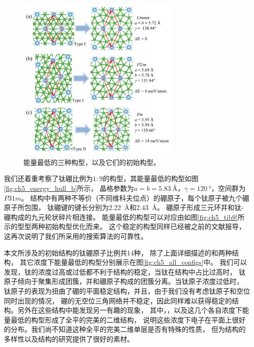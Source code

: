 \begin{figure}[htb]
  \includegraphics[width=0.72\textwidth]{figs/ch5_tib7_last3.png}
  \centering
  \caption{能量最低的三种构型，以及它们的初始构型。}
  \label{fig:ch5_tib7_last3}
\end{figure}


我们还着重考察了钛硼比例为$1:9$的构型，其能量最低的构型如图\ref{fig:ch5_energy_hull_b}所示，
晶格参数为$a=b=\SI{5.83}{\angstrom}$，$\gamma=\SI{120}{\degree}$，空间群为$P31m$。
结构中有两种不等价（不同维科夫位点）的硼原子，每个钛原子被九个硼原子所包围，
钛硼键的键长分别为\SI{2.22}{\angstrom}和\SI{2.43}{\angstrom}。
硼原子形成三元环并和钛-硼构成的九元轮状碎片相连接。
能量最低的构型可以对应由如图\ref{fig:ch5_tib9}所示的型型两种初始构型优化而来。
这个稳定的构型同样已经被之前的文献\cite{wang2017semimetallic}报导，
这再次说明了我们所采用的搜索算法的可靠性。
  
本文所涉及的初始结构的钛硼原子比例共\num{14}种，
除了上面详细描述的和两种结构，
其它浓度下能量最低的构型分别展示在图\ref{fig:ch5_all_configs}中。
我们可以发现，钛的浓度过高或过低都不利于结构的稳定，当钛在结构中占比过高时，
钛原子倾向于聚集形成团簇，并和硼原子构成的团簇分离。当钛原子浓度过低时，
钛原子的表现为扭曲了硼的平面稳定结构，并且，由于我们没有考虑钛原子和空位同时出现的情况，
硼的无空位三角网络并不稳定，因此同样难以获得稳定的结构。另外在这些结构中能发现另一有趣的现象，
其中，，以及这几个各自浓度下能量最低的构型形成了全平的完美的二维结构，
说明这些浓度下电子在平面上很好的分布。我们尚不知道这种全平的完美二维单层是否有特殊的性质，
但为结构的多样性以及结构的研究提供了很好的素材。


